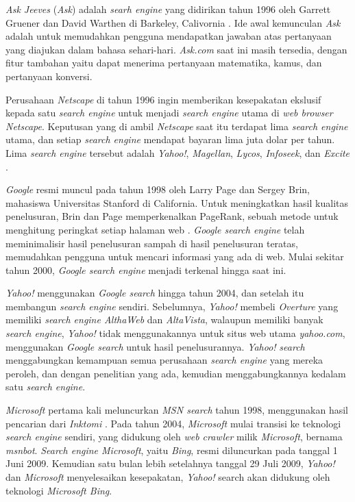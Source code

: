 \emph{Ask Jeeves} (\emph{Ask}) adalah \emph{searh engine} yang didirikan tahun 1996 oleh Garrett Gruener dan David Warthen di Barkeley, Calivornia \cite{seymour2011history}. Ide awal kemunculan \emph{Ask} adalah untuk memudahkan pengguna mendapatkan jawaban atas pertanyaan yang diajukan dalam bahasa sehari-hari. \emph{Ask.com} saat ini masih tersedia, dengan fitur tambahan yaitu dapat menerima pertanyaan matematika, kamus, dan pertanyaan konversi.

Perusahaan \emph{Netscape} di tahun 1996 ingin memberikan kesepakatan ekslusif kepada satu \emph{search engine} untuk menjadi \emph{search engine} utama di \emph{web browser Netscape}. Keputusan yang di ambil \emph{Netscape} saat itu terdapat lima \emph{search engine} utama, dan setiap \emph{search engine} mendapat bayaran lima juta dolar per tahun. Lima \emph{search engine} tersebut adalah \emph{Yahoo!}, \emph{Magellan}, \emph{Lycos}, \emph{Infoseek}, dan \emph{Excite} \cite{seymour2011history}.

\emph{Google} resmi muncul pada tahun 1998 oleh Larry Page dan Sergey Brin, mahasiswa Universitas Stanford di California. Untuk meningkatkan hasil kualitas penelusuran, Brin dan Page memperkenalkan PageRank, sebuah metode untuk menghitung peringkat setiap halaman web \cite{page1999pagerank}. \emph{Google search engine} telah meminimalisir hasil penelusuran sampah di hasil penelusuran teratas, memudahkan pengguna untuk mencari informasi yang ada di web. Mulai sekitar tahun 2000, \emph{Google search engine} menjadi terkenal hingga saat ini. 

\emph{Yahoo!} menggunakan \emph{Google search} hingga tahun 2004, dan setelah itu membangun \emph{search engine} sendiri. Sebelumnya, \emph{Yahoo!} membeli \emph{Overture} yang memiliki \emph{search engine AlthaWeb} dan \emph{AltaVista}, walaupun memiliki banyak \emph{search engine}, \emph{Yahoo!} tidak menggunakannya untuk situs web utama \emph{yahoo.com}, menggunakan \emph{Google search} untuk hasil penelusurannya. \emph{Yahoo!} \emph{search} menggabungkan kemampuan semua perusahaan \emph{search engine} yang mereka peroleh, dan dengan penelitian yang ada, kemudian menggabungkannya kedalam satu \emph{search engine}.

\emph{Microsoft} pertama kali meluncurkan \emph{MSN search} tahun 1998, menggunakan hasil pencarian dari \emph{Inktomi} \cite{seymour2011history}. Pada tahun 2004, \emph{Microsoft} mulai transisi ke teknologi \emph{search engine} sendiri, yang didukung oleh \emph{web crawler} milik \emph{Microsoft}, bernama \emph{msnbot}. \emph{Search engine Microsoft}, yaitu \emph{Bing}, resmi diluncurkan pada tanggal 1 Juni 2009. Kemudian satu bulan lebih setelahnya tanggal 29 Juli 2009, \emph{Yahoo!} dan \emph{Microsoft} menyelesaikan kesepakatan, \emph{Yahoo!} search akan didukung oleh teknologi \emph{Microsoft Bing}.


